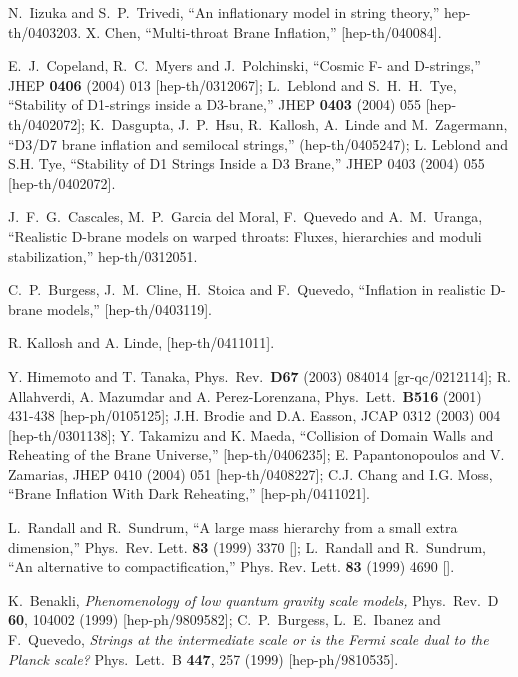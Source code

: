 \documentclass[12pt]{JHEP3}
\begin{document}
\begin{thebibliography}{4}
N.~Iizuka and S.~P.~Trivedi, ``An inflationary model in string
theory,'' hep-th/0403203.
%
X. Chen, ``Multi-throat Brane Inflation,'' [hep-th/040084].

E.~J.~Copeland, R.~C.~Myers and J.~Polchinski, ``Cosmic F- and
D-strings,'' JHEP {\bf 0406} (2004) 013 [hep-th/0312067];
%
L.~Leblond and S.~H.~H.~Tye, ``Stability of D1-strings inside a
D3-brane,'' JHEP {\bf 0403} (2004) 055 [hep-th/0402072];
%
K.~Dasgupta, J.~P.~Hsu, R.~Kallosh, A.~Linde and M.~Zagermann,
``D3/D7 brane inflation and semilocal strings,'' (hep-th/0405247);
%
L. Leblond and S.H. Tye, ``Stability of D1 Strings Inside a D3
Brane,'' JHEP 0403 (2004) 055 [hep-th/0402072].

J.~F.~G.~Cascales, M.~P.~Garcia del Moral, F.~Quevedo and
A.~M.~Uranga, ``Realistic D-brane models on warped throats:
Fluxes, hierarchies and moduli stabilization,'' hep-th/0312051.

C.~P.~Burgess, J.~M.~Cline, H.~Stoica and F.~Quevedo, ``Inflation
in realistic D-brane models,'' [hep-th/0403119].

R. Kallosh and A. Linde,
[hep-th/0411011].

Y. Himemoto and T. Tanaka, Phys.\ Rev.\ {\bf D67} (2003) 084014
[gr-qc/0212114];
%
R. Allahverdi, A. Mazumdar and A. Perez-Lorenzana, Phys.\ Lett.\
{\bf B516} (2001) 431-438 [hep-ph/0105125];
%
J.H. Brodie and D.A. Easson, JCAP 0312 (2003) 004
[hep-th/0301138];
%
Y. Takamizu and K. Maeda, ``Collision of Domain Walls and
Reheating of the Brane Universe,'' [hep-th/0406235];
%
E. Papantonopoulos and V. Zamarias, JHEP 0410 (2004) 051
[hep-th/0408227];
%
C.J. Chang and I.G. Moss, ``Brane Inflation With Dark Reheating,''
[hep-ph/0411021].

L.~Randall and R.~Sundrum,
``A large mass hierarchy from a small extra dimension,''
Phys.\ Rev. Lett. {\bf 83} ({1999}) {3370} [];
%
L.~Randall and R.~Sundrum,
``An alternative to compactification,''
Phys. Rev. Lett. {\bf 83} ({1999}) {4690} [].

K.~Benakli, {\it Phenomenology of low quantum gravity scale
models,} Phys.\ Rev.\ D {\bf 60}, 104002 (1999) [hep-ph/9809582];
C.~P.~Burgess, L.~E.~Ibanez and F.~Quevedo, {\it Strings at the
intermediate scale or is the Fermi scale dual to the  Planck
scale?} Phys.\ Lett.\ B {\bf 447}, 257 (1999) [hep-ph/9810535].


\end{thebibliography}
\end{document}
